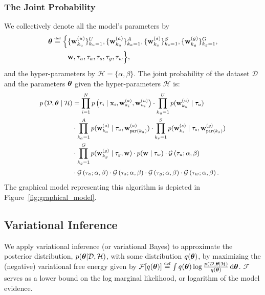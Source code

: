 \subsubsection{The Joint Probability}
We collectively denote all the model's parameters by 
\begin{align*}
	\btheta \defined \Big\{
	& \{ \w_{k_u}^{(u)} \}_{k_u=1}^U, \{ \w_{k_a}^{(a)} \}_{k_a=1}^A, \{ \w_{k_s}^{(s)} \}_{k_s=1}^S, \{ \w_{k_g}^{(g)} \}_{k_g=1}^G,\\
	& \w, \tau_u, \tau_a, \tau_s, \tau_g, \tau_w \Big\},
	\label{eq:paramters}
\end{align*} 
and the hyper-parameters by $\mathcal{H}= \{ \alpha , \beta \} $.
The joint probability of the dataset $\mathcal{D}$ and the parameters $\bm{\theta}$ given the hyper-parameters $\mathcal{H}$ is: 
\begin{equation}
\begingroup\makeatletter\def\f@size{\fsize}\check@mathfonts
\def\maketag@@@#1{\hbox{\m@th\large\normalfont#1}}%
\begin{aligned}
p\left(\mathcal{D}, \btheta \mid \mathcal{H} \right)& = \prod_{i=1}^N p\left( r_i \mid \x_i , \w^{(a)}_{a_i}, \w^{(u)}_{u_i} \right) \cdot \prod_{k_u=1}^Up(\w^{(u)}_{k_u} \mid \tau_u ) \\
& \cdot \prod_{k_a=1}^Ap(\w^{(a)}_{k_a} \mid \tau_a, \w^{(a)}_{\parent(k_a)} ) 
\cdot \prod_{k_s=1}^S p(\w^{(s)}_{k_s} \mid \tau_s, \w^{(g)}_{\parent(k_s)} ) \\
& \cdot \prod_{k_g=1}^G p(\w^{(g)}_{k_g} \mid \tau_g, \w) \cdot p(\w \mid \tau_w ) \cdot \mathcal{G} \left(\tau_u ; \alpha, \beta \right)  \\
& \cdot \mathcal{G}\left(\tau_a ; \alpha, \beta \right) 
\cdot \mathcal{G}\left(\tau_s ; \alpha, \beta \right) 
\cdot \mathcal{G}\left(\tau_g ; \alpha, \beta \right)
\cdot \mathcal{G}\left(\tau_w ; \alpha, \beta \right).
\label{eq:joint-likelihood}
\end{aligned}\endgroup
\end{equation} 
The graphical model representing this algorithm is depicted in Figure~\ref{fig:graphical_model}.


\newpage
\subsection{Variational Inference}
We apply variational inference (or variational Bayes) to approximate the posterior distribution,
$p(\bm{\theta} | \mathcal{D}, \mathcal{H} )$,  with some distribution $q(\bm{\theta})$,
by maximizing the (negative) variational free energy given by
$
\mathcal{F} [ q(\btheta) ] \defined \int q(\btheta) \log \frac{p(\mathcal{D}, \btheta | \mathcal{H})}{q(\btheta)} \, \mathrm{d} \btheta
$.
$\mathcal{F}$ serves as a lower bound on the log marginal likelihood, or logarithm of the model evidence. 

